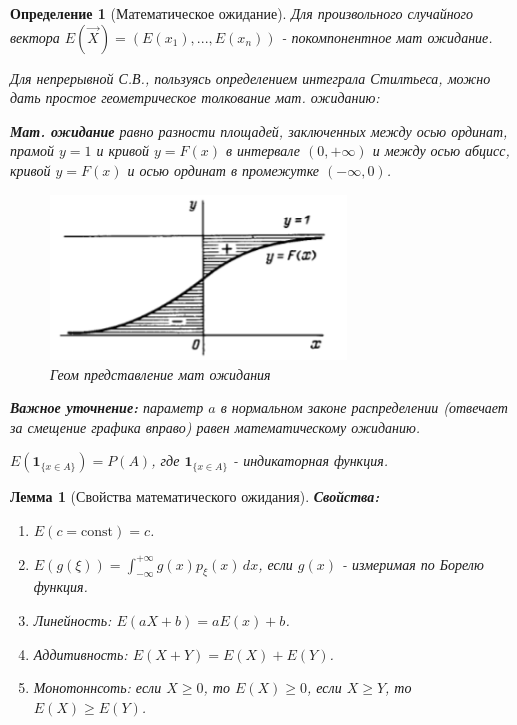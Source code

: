 \documentclass[14pt]{extarticle}
\theoremstyle{breakstyle}
\newtheorem{definition}{Определение}[subsection]
\newtheorem{lemma}{Лемма}[subsection]
\begin{document}
\begin{definition}[Математическое ожидание]
\vspace{\baselineskip}

Для произвольного случайного вектора $E(\vec{X}) = (E(x_{1}), ..., E(x_{n}))$ - покомпонентное мат ожидание.

\vspace{\baselineskip}

Для непрерывной С.В., пользуясь определением интеграла Стилтьеса, можно дать простое геометрическое толкование мат. ожиданию:

\vspace{\baselineskip}

\textbf{Мат. ожидание} равно разности площадей, заключенных между осью ординат, прамой $y = 1$ и кривой $y = F(x)$ в интервале $(0, +\infty)$ и между осью абцисс, кривой $y = F(x)$ и осью ординат в промежутке $(-\infty, 0)$.

\begin{figure}[H]
    \centering
    \includegraphics[width=0.7\textwidth]{images/e-geometry.png}
    \caption{Геом представление мат ожидания}
    \label{fig:e-geometry}
\end{figure}

\vspace{\baselineskip}

\textbf{Важное уточнение:} параметр $a$ в нормальном законе распределении (отвечает за смещение графика вправо) равен математическому ожиданию.

\vspace{\baselineskip}

$E(\mathbf{1}_{\{x \in A\}}) = P(A)$, где $\mathbf{1}_{\{x \in A\}}$ - индикаторная функция.

\end{definition}

\begin{lemma}[Свойства математического ожидания]

\textbf{Свойства:}
\begin{enumerate}
    \item $E(c=\text{const}) = c$.
    \item $E(g(\xi)) = \int_{-\infty}^{+\infty} g(x)p_{\xi}(x) \, dx$, если $g(x)$ - измеримая по Борелю функция.  
    \item Линейность: $E(aX + b) = aE(x) + b$.
    \item Аддитивность: $E(X + Y) = E(X) + E(Y)$.
    \item Монотоннсоть: если $X \geq 0$, то $E(X) \geq 0$, если $X \geq Y$, то $E(X) \geq E(Y)$.
\end{enumerate}

\end{lemma}
\end{document}
